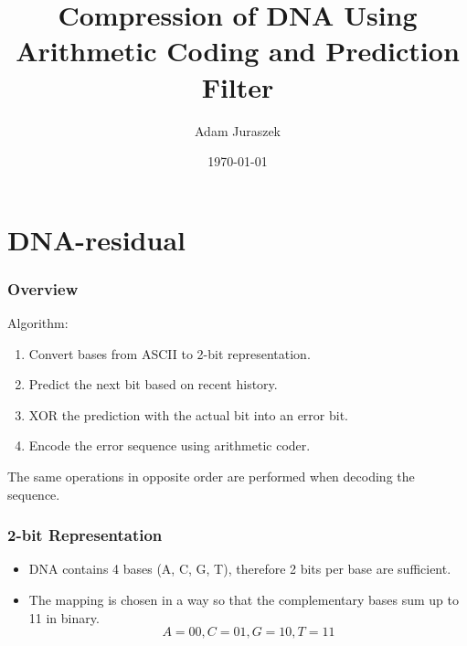 \documentclass[hyperref={colorlinks=true}]{beamer}
\title[DNA Compression]{Compression of DNA Using Arithmetic Coding and Prediction Filter}
\author{Adam Juraszek} %
\institute[MFF UK] %
{
Matematicko-fyzikální fakulta UK \\
\medskip
\textit{juriad@gmail.com} %
}
\date{\today} %
\begin{document}
\begin{frame}
\titlepage %
\end{frame}


\section{DNA-residual} 

\begin{frame}
\frametitle{Overview}

Algorithm:
\begin{enumerate}
	\item Convert bases from ASCII to 2-bit representation.
	\item Predict the next bit based on recent history.
	\item XOR the prediction with the actual bit into an error bit.
	\item Encode the error sequence using arithmetic coder.
\end{enumerate}
The same operations in opposite order are performed when decoding the sequence. 

\end{frame}

\begin{frame}
\frametitle{2-bit Representation}

\begin{itemize}
	\item DNA contains 4 bases (A, C, G, T), therefore 2 bits per base are sufficient.
	\item The mapping is chosen in a way so that the complementary bases sum up to 11 in binary.
		$$ A=00, C=01, G=10, T=11 $$
\end{itemize}

\end{frame}
\end{document}
